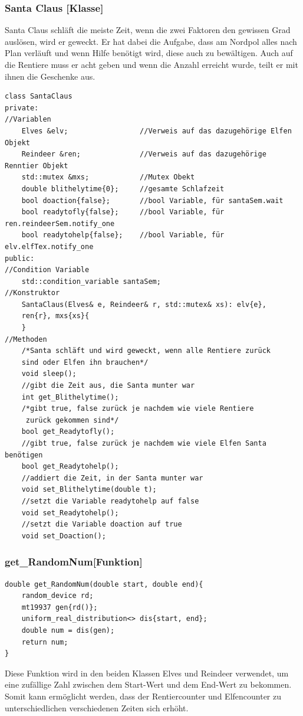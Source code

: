 \documentclass[a4paper,12pt]{article}
\begin{document}
\subsubsection{Santa Claus [Klasse]}
Santa Claus schläft die meiste Zeit, wenn die zwei Faktoren den gewissen Grad auslösen, wird er geweckt. Er hat dabei die Aufgabe, dass am Nordpol alles
nach Plan verläuft und wenn Hilfe benötigt wird, diese auch zu bewältigen. Auch auf die Rentiere muss er acht geben und wenn die Anzahl erreicht wurde, teilt er mit ihnen die Geschenke aus.
\begin{verbatim}
class SantaClaus
private:
//Variablen
    Elves &elv;                 //Verweis auf das dazugehörige Elfen Objekt
    Reindeer &ren;              //Verweis auf das dazugehörige Renntier Objekt
    std::mutex &mxs;            //Mutex Obekt
    double blithelytime{0};     //gesamte Schlafzeit
    bool doaction{false};       //bool Variable, für santaSem.wait
    bool readytofly{false};     //bool Variable, für ren.reindeerSem.notify_one       
    bool readytohelp{false};    //bool Variable, für elv.elfTex.notify_one
public:
//Condition Variable
    std::condition_variable santaSem;
//Konstruktor
    SantaClaus(Elves& e, Reindeer& r, std::mutex& xs): elv{e},
    ren{r}, mxs{xs}{
    }
//Methoden
    /*Santa schläft und wird geweckt, wenn alle Rentiere zurück 
    sind oder Elfen ihn brauchen*/
    void sleep();      
    //gibt die Zeit aus, die Santa munter war         
    int get_Blithelytime(); 
    /*gibt true, false zurück je nachdem wie viele Rentiere
     zurück gekommen sind*/
    bool get_Readytofly(); 
    //gibt true, false zurück je nachdem wie viele Elfen Santa benötigen
    bool get_Readytohelp();
    //addiert die Zeit, in der Santa munter war
    void set_Blithelytime(double t);
    //setzt die Variable readytohelp auf false
    void set_Readytohelp();
    //setzt die Variable doaction auf true
    void set_Doaction();
\end{verbatim}
\subsubsection{get\_RandomNum[Funktion]}
\begin{verbatim}
double get_RandomNum(double start, double end){
    random_device rd;
    mt19937 gen{rd()};
    uniform_real_distribution<> dis{start, end};
    double num = dis(gen);
    return num;
}
\end{verbatim}
Diese Funktion wird in den beiden Klassen Elves und Reindeer verwendet, um eine zufällige Zahl zwischen dem
Start-Wert und dem End-Wert zu bekommen. Somit kann ermöglicht werden, dass der Rentiercounter und Elfencounter zu unterschiedlichen
verschiedenen Zeiten sich erhöht. 
\\
\end{document}
